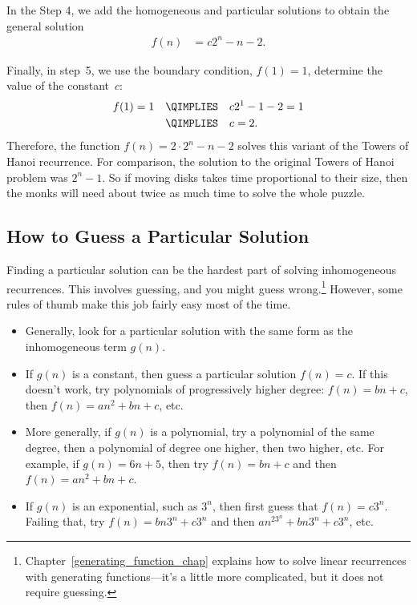 In the Step 4, we add the homogeneous and particular solutions to
obtain the general solution
\begin{align*}
f(n) & = c 2^n - n - 2.
\end{align*}

Finally, in step~5, we use the boundary condition, $f(1) = 1$,
determine the value of the constant~$c$:
\begin{align*}
f(1) = 1 \quad & \QIMPLIES \quad c 2^1 - 1 - 2 = 1 \\
  & \QIMPLIES \quad c = 2.
\end{align*}
Therefore, the function $f(n) = 2 \cdot 2^n - n - 2$ solves this
variant of the Towers of Hanoi recurrence.  For comparison, the
solution to the original Towers of Hanoi problem was $2^n - 1$.  So if
moving disks takes time proportional to their size, then the monks
will need about twice as much time to solve the whole puzzle.

\subsection{How to Guess a Particular Solution}

Finding a particular solution can be the hardest part of solving
inhomogeneous recurrences.  This involves guessing, and you might
guess wrong.\footnote{Chapter~\ref{generating_function_chap} explains
  how to solve linear recurrences with generating functions---it's a
  little more complicated, but it does not require guessing.}
However, some rules of thumb make this job fairly easy most of the
time.

\begin{itemize}
\item Generally, look for a particular solution with the same form as
  the inhomogeneous term $g(n)$.
\item If $g(n)$ is a constant, then guess a particular solution $f(n)
  = c$.  If this doesn't work, try polynomials of progressively higher
  degree:  $f(n)=bn+c$, then $f(n)=an^2 +bn+c$, etc.
\item More generally, if $g(n)$ is a polynomial, try a polynomial of
  the same degree, then a polynomial of degree one higher, then two
  higher, etc.  For example, if $g(n) = 6n + 5$, then try $f(n)=bn+c$
  and then $f(n)=an^2 +bn+c$.
\item If $g(n)$ is an exponential, such as $3^n$, then first guess
  that $f(n) = c3^n$.  Failing that, try $f(n) = bn3^n + c3^n$ and then
  $an^23^n + bn3^n + c3^n$, etc.
\end{itemize}

